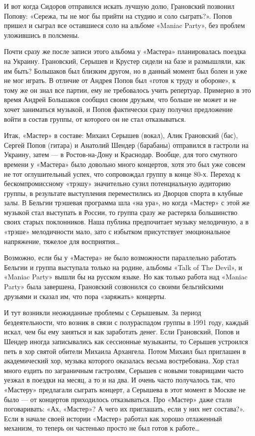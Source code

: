 \documentclass[16pt,a5paper,oneside]{book}
\begin{document}
И вот когда Сидоров отправился искать лучшую долю, Грановский позвонил Попову: «Сережа, ты не мог бы прийти на студию и
соло сыграть?». Попов пришел и сыграл все оставшиеся соло на альбоме «Maniac Party», без проблем уложившись в полсмены.

Почти сразу же после записи этого альбома у «Мастера» планировалась поездка на Украину. Грановский, Серышев и Крустер
сидели на базе и размышляли, как им быть? Большаков был близким другом, но в данный момент был болен и уже не мог
играть. В отличие от Андрея Попов был «готов к труду и обороне», к тому же он знал все партии, ему не требовалось учить
репертуар. Примерно в это время Андрей Большаков сообщил своим друзьям, что больше не может и не хочет заниматься
музыкой, и Попов фактически сразу получил предложение войти в состав группы, от которого он не стал отказываться.

Итак, «Мастер» в составе: Михаил Серышев (вокал), Алик Грановский (бас), Сергей Попов (гитара) и Анатолий Шендер
(барабаны) отправился в гастроли на Украину, затем — в Ростов-на-Дону и Краснодар. Вообще, для того смутного времени у
«Мастера» было довольно много концертов, хотя это был уже совсем не тот оглушительный успех, что сопровождал группу в
конце 80-х. Переход к бескомпромиссному «трэшу» значительно сузил потенциальную аудиторию группы, в результате
выступления переместились из Дворцов спорта в клубные залы. В Бельгии трэшевая программа шла «на ура», но когда «Мастер»
с этой же музыкой стал выступать в России, то группа сразу же растеряла большинство своих старых поклонников. Наша
публика предпочитает музыку мелодичную, а в «трэше» мелодичности мало, зато с избытком присутствует эмоциональное
напряжение, тяжелое для восприятия\ldots

Возможно, если бы у «Мастера» не было возможности параллельно работать Бельгии и группа выступала только на родине,
альбомы «Talk of The Devil», и «Maniac Party» вышли бы на русском языке. Но как только работа над «Maniac Party» была
завершена, Грановский созвонился со своими бельгийскими друзьями и сказал им, что пора «заряжать» концерты.

И тут возникли неожиданные проблемы с Серышевым. За период бездеятельности, что возник в связи с полураспадом группы в
1991 году, каждый искал, чем бы ему заняться и как заработать денег. Если Грановский, Попов и Шендер иногда записывались
как сессионные музыканты, то Серышев устроился петь в хор святой обители Михаила Архангела. Потом Михаил был приглашен в
академический хор, музыка которого оказалась весьма востребована. Хор стал много ездить по заграничным гастролям,
Серышев с новыми товарищами часто уезжал в поездки на месяц, а то и на два. И очень часто получалось так, что «Мастеру»
предлагали сыграть концерт, а Серышева в этот момент в Москве не было — от концертов приходилось отказываться. Про
«Мастер» даже стали поговаривать: «Ах, «Мастер»? А чего их приглашать, если у них нет состава?». Если в начале своей
истории «Мастер» работал как хорошо отлаженный механизм, то теперь он частенько просто не был готов к работе\ldots
\end{document}
